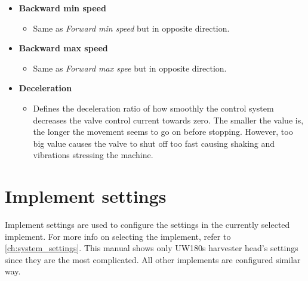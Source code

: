 \documentclass[12pt,a4paper,english]{uvmanual}
\begin{document}
\begin{itemize}
 \item \textbf{Backward min speed}
 \begin{itemize}
  \item Same as \textit{Forward min speed} but in opposite direction.
 \end{itemize}

 \item \textbf{Backward max speed}
 \begin{itemize}
  \item Same as \textit{Forward max spee} but in opposite direction.
 \end{itemize}

 \item \textbf{Deceleration}
 \begin{itemize}
  \item Defines the deceleration ratio of how smoothly the control system decreases the valve control current towards zero. The smaller the value is, the longer the movement seems to go on before stopping. However, too big value causes the valve to shut off too fast causing shaking and vibrations stressing the machine.
 \end{itemize}

\end{itemize}



\section{Implement settings}\label{ch:settings_implement}

Implement settings are used to configure the settings in the currently selected implement. For more info on selecting the implement, refer to \autoref{ch:system_settings}. This manual shows only UW180s harvester head's settings since they are the most complicated. All other implements are configured similar way.

\end{document}
